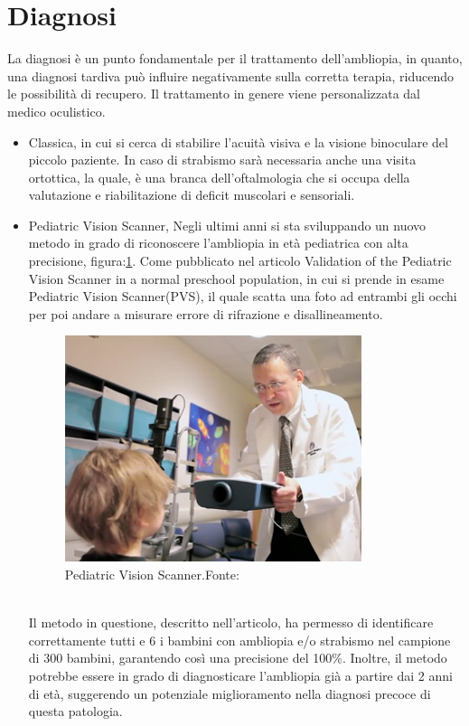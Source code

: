 \documentclass[
a4paper,
cleardoublepage=empty,
headings=twolinechapter,
numbers=autoenddot,
]{scrbook}
\begin{document}
	\section{Diagnosi}
	La diagnosi è un punto fondamentale per il trattamento dell'ambliopia, in quanto, una diagnosi tardiva può influire negativamente sulla corretta terapia, riducendo le possibilità di recupero.
	Il trattamento in genere viene personalizzata dal medico oculistico.
	\begin{itemize}
		\item Classica, in cui si cerca di stabilire l'acuità visiva e la visione binoculare del piccolo paziente. In caso di strabismo sarà necessaria anche una visita ortottica, la quale, è una branca dell'oftalmologia che si occupa della valutazione e riabilitazione di deficit muscolari e sensoriali.
		\item Pediatric Vision Scanner, Negli ultimi anni si sta sviluppando un nuovo metodo in grado di riconoscere l'ambliopia in età pediatrica con alta precisione, figura:\ref{fig:pvs}.
		Come pubblicato nel articolo Validation of the Pediatric Vision Scanner in a normal preschool population\cite{pvs}, in cui si prende in esame Pediatric Vision Scanner(PVS), il quale scatta una foto ad entrambi gli occhi per poi andare a misurare errore di rifrazione e disallineamento.
			\begin{figure}[h]
				\centering
				\includegraphics[width=0.7\linewidth]{image/pvs}
				\caption{Pediatric Vision Scanner.Fonte:\cite{PVS_image}}
				\label{fig:pvs}
	    	\end{figure}\\
        Il metodo in questione, descritto nell'articolo, ha permesso di identificare correttamente tutti e 6 i bambini con ambliopia e/o strabismo nel campione di 300 bambini, garantendo così una precisione del 100\%. Inoltre, il metodo potrebbe essere in grado di diagnosticare l'ambliopia già a partire dai 2 anni di età, suggerendo un potenziale miglioramento nella diagnosi precoce di questa patologia.
	
	\end{itemize}
   
\end{document}
